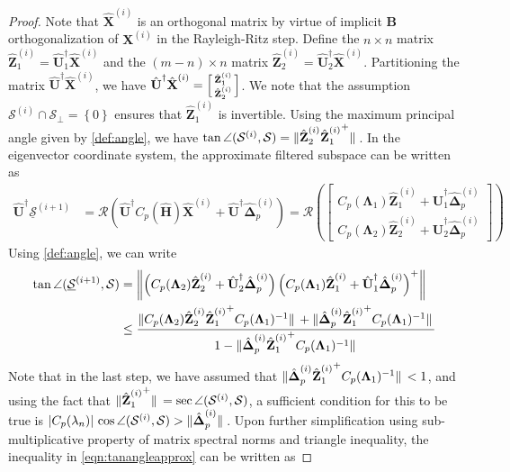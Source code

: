 \documentclass[preprint,3p,number,sort&compress]{elsarticle}
\newcommand{\bB}{\textbf{B}}
\newcommand{\bH}{\textbf{H}}
\newcommand{\bX}{\textbf{X}}
\newcommand{\bZ}{\textbf{Z}}
\newcommand{\bU}{\textbf{U}}
\newcommand{\bDelta}{\boldsymbol{\Delta}}
\newcommand{\bLam}{\boldsymbol{\Lambda}}
\DeclarePairedDelimiter\norm{\lVert}{\rVert\,}%
\DeclarePairedDelimiter\abs{\lvert}{\rvert\,}%
\begin{document}
\begin{proof}
Note that $\hat{\bX}^{(i)}$ is an orthogonal matrix by virtue of implicit $\bB$ orthogonalization of $\bX^{(i)}$ in the Rayleigh-Ritz step. Define the $n\times n$ matrix $\hat{\bZ}_1^{(i)}=\hat{\bU}_1^\dagger\hat{\bX}^{(i)}$ and the $(m-n)\times n$ matrix $\hat{\bZ}_2^{(i)}=\hat{\bU}_2^\dagger\hat{\bX}^{(i)}$. Partitioning the matrix $\hat{\bU}^\dagger\hat{\bX}^{(i)}$, we have $\hat{\bU}^\dagger\hat{\bX}^{(i)}=\Bigl[\begin{smallmatrix}
  \hat{\bZ}_1^{(i)}\\\hat{\bZ}_2^{(i)}
 \end{smallmatrix}\Bigr]$. We note that the assumption $\mathcal{S}^{(i)}\cap\mathcal{S}_\perp=\left\{0\right\}$ ensures that $\hat{\bZ}_1^{(i)}$ is invertible.
Using the maximum principal angle given by \cref{def:angle}, we have $\tan{\angle(\mathcal{S}^{(i)},\mathcal{S})}=\norm{\hat{\bZ}_2^{(i)}{{}\hat{\bZ}_1^{(i)}}^{+}}$. In the eigenvector coordinate system, the approximate filtered subspace can be written as
 \begin{align*}
  \hat{\bU}^\dagger\underline{\mathcal{S}}^{(i+1)}&=\mathcal{R}\left(\hat{\bU}^\dagger C_p(\hat{\bH})\hat{\bX}^{(i)}+\hat{\bU}^\dagger\hat{\bDelta}_p^{(i)}\right)=\mathcal{R}\left(\begin{bmatrix}
   C_p(\bLam_1)\hat{\bZ}_1^{(i)}+\hat{\bU}_1^\dagger\hat{\bDelta}_p^{(i)}\\C_p(\bLam_2)\hat{\bZ}_2^{(i)}+\hat{\bU}_2^\dagger\hat{\bDelta}_p^{(i)}
  \end{bmatrix}\right)
 \end{align*}
Using \cref{def:angle}, we can write
 \begin{align}
\tan{\angle(\underline{\mathcal{S}}^{(i+1)},\mathcal{S})}&=\norm*{\left(C_p(\bLam_2)\hat{\bZ}_2^{(i)}+\hat{\bU}_2^\dagger\hat{\bDelta}_p^{(i)}\right)\left(C_p(\bLam_1)\hat{\bZ}_1^{(i)}+\hat{\bU}_1^\dagger\hat{\bDelta}_p^{(i)}\right)^{+}} \nonumber\\
  &\leq\frac{\norm{C_p(\bLam_2)\hat{\bZ}_2^{(i)}{{}\hat{\bZ}_1^{(i)}}^{+}C_p(\bLam_1)^{-1}}+\norm{\hat{\bDelta}_p^{(i)}{{}\hat{\bZ}_1^{(i)}}^{+}C_p(\bLam_1)^{-1}}}{1-\norm{\hat{\bDelta}_p^{(i)}{{}\hat{\bZ}_1^{(i)}}^{+}C_p(\bLam_1)^{-1}}} \label{eqn:tanangleapprox}
 \end{align}
 Note that in the last step, we have assumed that $\norm{\hat{\bDelta}_p^{(i)}{{}\hat{\bZ}_1^{(i)}}^{+}C_p(\bLam_1)^{-1}}<1$, and using the fact that $\norm{{{}\hat{\bZ}_1^{(i)}}^{+}}=\sec{\angle(\mathcal{S}^{(i)},\mathcal{S})}$, a sufficient condition for this to be true is $\abs{C_p(\lambda_n)}\cos{\angle(\mathcal{S}^{(i)},\mathcal{S})}>\norm{\hat{\bDelta}_p^{(i)}}$. Upon further simplification using sub-multiplicative property of matrix spectral norms and triangle inequality, the inequality in \cref{eqn:tanangleapprox} can be written as 
 

\end{proof}
\end{document}
